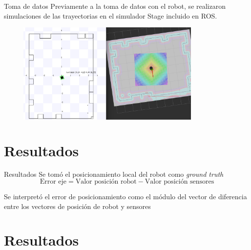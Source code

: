 \documentclass{beamer}
\begin{document}
  \begin{frame}{Toma de datos}
    Previamente a la toma de datos con el robot, se realizaron simulaciones de las trayectorias en el simulador Stage incluido en ROS.

    \begin{figure}[H]
      \centering
      \includegraphics[height=5cm]{pic/Stage-rviz.png}
      \label{fig:robot}
  \end{figure}
  \end{frame}

\section{Resultados}
  \begin{frame}{Resultados}
    Se tomó el posicionamiento local del robot como \textit{ground truth}
    \begin{equation*}\label{eq:Diff_eje}
      \text{Error eje} = \text{Valor posición robot} - \text{Valor posición sensores}
    \end{equation*}

    Se interpretó el error de posicionamiento como el módulo del vector de diferencia entre los vectores de posición de robot y sensores
    \begin{figure}[H]
      \centering
      
    \end{figure}
  \end{frame}

\section[Laboratorio]{Resultados}
\end{document}
